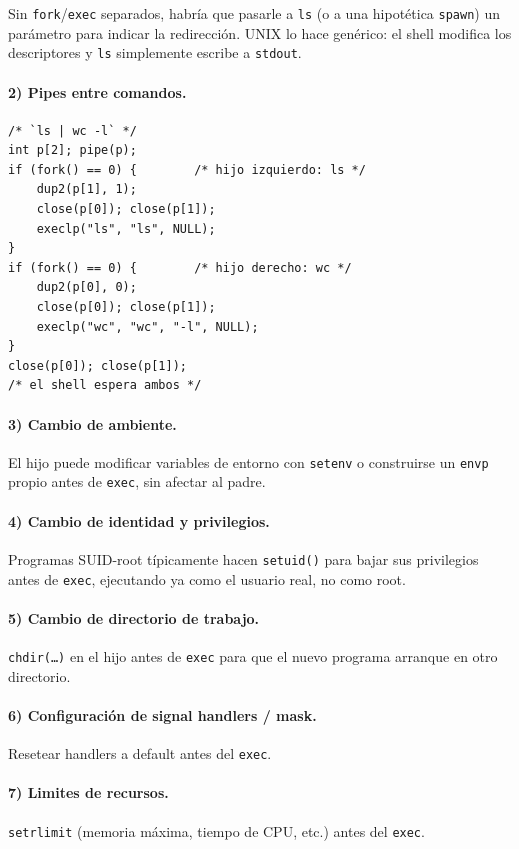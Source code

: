 \documentclass[11pt,a4paper]{article}
\begin{document}
Sin \texttt{fork}/\texttt{exec} separados, habría que pasarle a
\texttt{ls} (o a una hipotética \texttt{spawn}) un parámetro para
indicar la redirección. UNIX lo hace genérico: el shell modifica los
descriptores y \texttt{ls} simplemente escribe a \texttt{stdout}.

\paragraph{2) Pipes entre comandos.}

\begin{lstlisting}[style=cstyle]
/* `ls | wc -l` */
int p[2]; pipe(p);
if (fork() == 0) {        /* hijo izquierdo: ls */
    dup2(p[1], 1);
    close(p[0]); close(p[1]);
    execlp("ls", "ls", NULL);
}
if (fork() == 0) {        /* hijo derecho: wc */
    dup2(p[0], 0);
    close(p[0]); close(p[1]);
    execlp("wc", "wc", "-l", NULL);
}
close(p[0]); close(p[1]);
/* el shell espera ambos */
\end{lstlisting}

\paragraph{3) Cambio de ambiente.}
El hijo puede modificar variables de entorno con \texttt{setenv} o
construirse un \texttt{envp} propio antes de \texttt{exec}, sin
afectar al padre.

\paragraph{4) Cambio de identidad y privilegios.}
Programas SUID-root típicamente hacen \texttt{setuid()} para bajar
sus privilegios antes de \texttt{exec}, ejecutando ya como el usuario
real, no como root.

\paragraph{5) Cambio de directorio de trabajo.}
\texttt{chdir(\ldots)} en el hijo antes de \texttt{exec} para que
el nuevo programa arranque en otro directorio.

\paragraph{6) Configuración de signal handlers / mask.}
Resetear handlers a default antes del \texttt{exec}.

\paragraph{7) Limites de recursos.}
\texttt{setrlimit} (memoria máxima, tiempo de CPU, etc.) antes del
\texttt{exec}.
\end{document}
